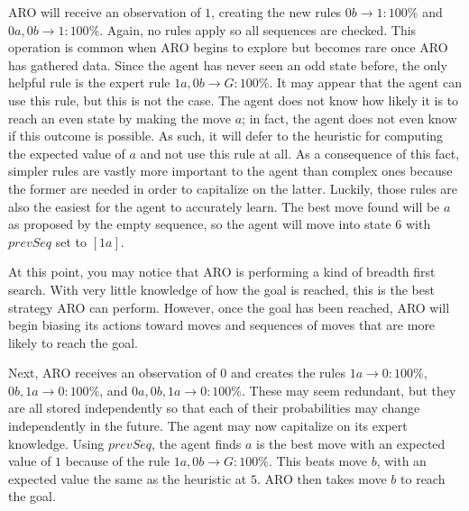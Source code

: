 \documentclass[letterpaper]{article} %
\begin{document}

ARO will receive an observation of $1$, creating the new rules $0b \rightarrow 1: 100\%$ and $0a, 0b \rightarrow 1: 100\%$. Again, no rules apply so all sequences are checked. This operation is common when ARO begins to explore but becomes rare once ARO has gathered data. Since the agent has never seen an odd state before, the only helpful rule is the expert rule $1a, 0b \rightarrow G: 100\%$. It may appear that the agent can use this rule, but this is not the case. The agent does not know how likely it is to reach an even state by making the move $a$; in fact, the agent does not even know if this outcome is possible. As such, it will defer to the heuristic for computing the expected value of $a$ and not use this rule at all. As a consequence of this fact, simpler rules are vastly more important to the agent than complex ones because the former are needed in order to capitalize on the latter. Luckily, those rules are also the easiest for the agent to accurately learn. The best move found will be $a$ as proposed by the empty sequence, so the agent will move into state $6$ with $prevSeq$ set to $[1a]$.

At this point, you may notice that ARO is performing a kind of breadth first search. With very little knowledge  of how the goal is reached, this is the best strategy ARO can perform. However, once the goal has been reached, ARO will begin biasing its actions toward moves and sequences of moves that are more likely to reach the goal. 

Next, ARO receives an observation of $0$ and creates the rules $1a \rightarrow 0: 100\%$, $0b, 1a \rightarrow 0: 100\%$, and $0a, 0b, 1a \rightarrow 0: 100\%$. These may seem redundant, but they are all stored independently so that each of their probabilities may change independently in the future. The agent may now capitalize on its expert knowledge. Using $prevSeq$, the agent finds $a$ is the best move with an expected value of $1$ because of the rule $1a, 0b \rightarrow G: 100\%$. This beats move $b$, with an expected value the same as the heuristic at $5$. ARO then takes move $b$ to reach the goal.
\end{document}
